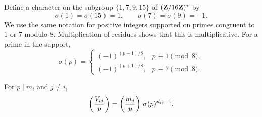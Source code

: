 Define a character on the subgroup $\{1,7,9,15\}$ of
$(\mathbf Z/16\mathbf Z)^*$ by
\begin{equation}\label{eq:profile-sigma}
 \sigma(1)=\sigma(15)=1,\qquad
 \sigma(7)=\sigma(9)=-1.
\end{equation}
We use the same notation for positive integers supported on primes
congruent to $1$ or $7$ modulo $8$.  Multiplication of residues shows
that this is multiplicative.  For a prime in the support,
\begin{equation}\label{eq:profile-prime-sigma}
 \sigma(p)=
 \begin{cases}
 (-1)^{(p-1)/8},&p\equiv1\pmod8,\\
 (-1)^{(p+1)/8},&p\equiv7\pmod8.
 \end{cases}
\end{equation}

\begin{lemma}\label{lem:profile-ramified-character}
For $p\mid m_i$ and $j\ne i$,
\begin{equation}\label{eq:profile-ramified-character}
 \left(\frac{V_{ij}}{p}\right)=\left(\frac{m_j}{p}\right)\,\sigma(p)^{d_{ij}-1}.
\end{equation}
\end{lemma}

